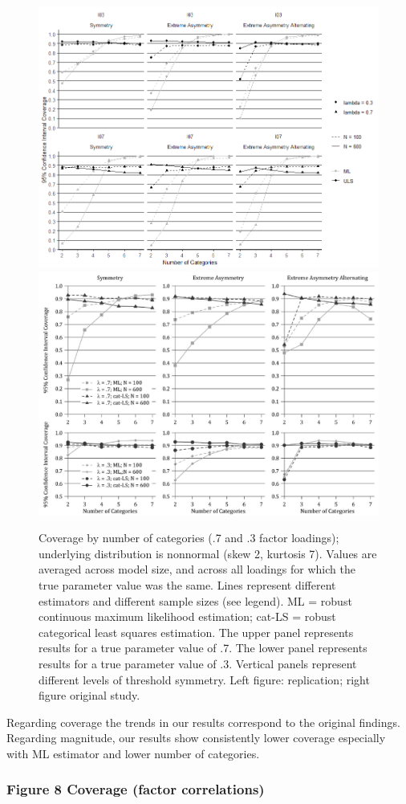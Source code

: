 \documentclass[10,a4paperpaper,]{article}
\begin{document}
\begin{figure}
\includegraphics[width=0.49\linewidth]{./figures/fig7} \includegraphics[width=0.49\linewidth]{./figures/fig7_original} \caption{Coverage by number of categories (.7 and .3 factor loadings); underlying distribution is nonnormal (skew 2, kurtosis 7). Values are averaged across model size, and across all loadings for which the true parameter value was the same. Lines represent different estimators and different sample sizes (see legend). ML = robust continuous maximum likelihood estimation; cat-LS = robust categorical least squares estimation. The upper panel represents results for a true parameter value of .7. The lower panel represents results for a true parameter value of .3. Vertical panels represent different levels of threshold symmetry. Left figure: replication; right figure original study.}\label{fig:fig7}
\end{figure}

Regarding coverage the trends in our results correspond to the original
findings. Regarding magnitude, our results show consistently lower
coverage especially with ML estimator and lower number of categories.

\subsubsection{Figure 8 Coverage (factor correlations)}
\end{document}
